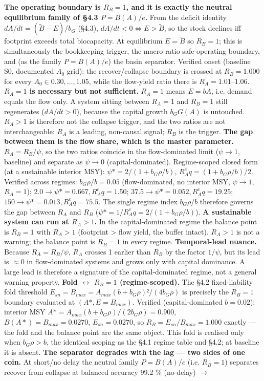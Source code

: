 \documentclass[11pt]{article}
\begin{document}
\textbf{The operating boundary is $R_{B} = 1$, and it is exactly the neutral equilibrium family of §4.3 $P = B(A)/e$.} From the deficit identity $dA/dt = (\tilde{B} - E)/b_{G}$ (§4.3), $dA/dt < 0 \iff{} E > \tilde{B}$, so the stock declines iff footprint exceeds total biocapacity. At equilibrium $E = \tilde{B}$ so $R_{B} = 1$; this is simultaneously the bookkeeping trigger, the macro-ratio safe-operating boundary, and (as the family $P = B(A)/e$) the basin separator. Verified onset (baseline S0, documented $A_{0}$ grid): the recover/collapse boundary is crossed at $R_{B} = 1.000$ for every $A_{0} \in{} {0.30,\ldots{},1.05}$, while the flow-yield ratio there is $R_{A} = 1.01–1.06$. \textbf{$R_{A} = 1$ is necessary but not sufficient.} $R_{A} = 1$ means $E = bA$, i.e. demand equals the flow only. A system sitting between $R_{A} = 1$ and $R_{B} = 1$ still regenerates ($dA/dt > 0$), because the capital growth $b_{G} G(A)$ is untouched. $R_{A} > 1$ is therefore not the collapse trigger, and the two ratios are not interchangeable: $R_{A}$ is a leading, non-causal signal; $R_{B}$ is the trigger. \textbf{The gap between them is the flow share, which is the master parameter.} $R_{A} = R_{B}/\psi{}$, so the two ratios coincide in the flow-dominated limit ($\psi{} \to{} 1$, baseline) and separate as $\psi{} \to{} 0$ (capital-dominated). Regime-scoped closed form (at a sustainable interior MSY): $\psi{}* = 2/(1 + b_{G}\rho{}/b)$, $R_{A}^eq = (1 + b_{G}\rho{}/b)/2$. Verified across regimes: $b_{G}\rho{}/b = 0.05$ (flow-dominated, no interior MSY, $\psi{} \to{} 1$, $R_{A} = 1$); $2.0 \to{} \psi{}* = 0.667, R_{A}^eq = 1.50$; $37.5 \to{} \psi{}* = 0.052, R_{A}^eq = 19.25$; $150 \to{} \psi{}* = 0.013, R_{A}^eq = 75.5$. The single regime index $b_{G}\rho{}/b$ therefore governs the gap between $R_{A}$ and $R_{B}$ ($\psi{}* = 1/R_{A}^eq = 2/(1 + b_{G}\rho{}/b)$). \textbf{A sustainable system can run at $R_{A} > 1$.} In the capital-dominated regime the balance point is $R_{B} = 1$ with $R_{A} > 1$ (footprint > flow yield, the buffer intact). $R_{A} > 1$ is not a warning; the balance point is $R_{B} = 1$ in every regime. \textbf{Temporal-lead nuance.} Because $R_{A} = R_{B}/\psi{}$, $R_{A}$ crosses 1 earlier than $R_{B}$ by the factor $1/\psi{}$, but its lead is \ensuremath{\approx{}}0 in flow-dominated systems and grows only with capital dominance. A large lead is therefore a signature of the capital-dominated regime, not a general warning property. \textbf{Fold \ensuremath{\leftrightarrow{}} $R_{B} = 1$ (regime-scoped).} The §4.2 fixed-liability fold threshold $E_{sn} = B_{max} = A_{max}(b+b_{G}\rho{})²/(4b_{G}\rho{})$ is precisely the $R_{B} = 1$ boundary evaluated at $(A*, E = B_{max})$. Verified (capital-dominated $b = 0.02$): interior MSY $A* = A_{max}(b+b_{G}\rho{})/(2b_{G}\rho{}) = 0.900$, $B(A*) = B_{max} = 0.0270$, $E_{sn} = 0.0270$, so $R_{B} = E_{sn}/B_{max} = 1.000$ exactly — the fold and the balance point are the same object. This fold is realised only when $b_{G}\rho{} > b$, the identical scoping as the §4.1 regime table and §4.2; at baseline it is absent. \textbf{The separator degrades with the lag — two sides of one coin.} At short/no delay the neutral family $P = B(A)/e$ (i.e. $R_{B} = 1$) separates recover from collapse at balanced accuracy 99.2 \% (no-delay) \ensuremath{\to{}} 
\end{document}
